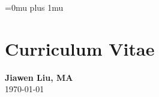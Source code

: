 \documentclass[12pt, letterpaper]{report}   %
\begin{document}


\newpage
\singlespace
\Urlmuskip=0mu plus 1mu\relax %




\chapter*{Curriculum Vitae}
\begin{large}
\begin{center}
\textbf{Jiawen Liu, MA}\\ 
\today\\
\end{center}
\end{large}
\end{document}
